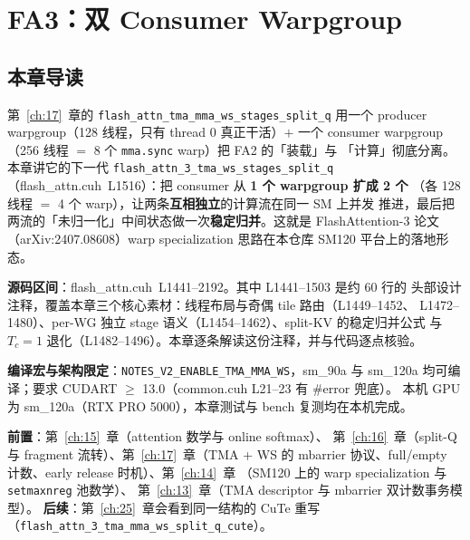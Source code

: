 \chapter{FA3：双 Consumer Warpgroup}\label{ch:18}

\section{本章导读}

第~\ref{ch:17}~章的 \texttt{flash\_\allowbreak{}attn\_\allowbreak{}tma\_\allowbreak{}mma\_\allowbreak{}ws\_\allowbreak{}stages\_\allowbreak{}split\_\allowbreak{}q} 用一个
producer warpgroup（128 线程，只有 thread 0 真正干活）$+$ 一个 consumer
warpgroup（256 线程 $=$ 8 个 \texttt{mma.sync} warp）把 FA2 的「装载」与
「计算」彻底分离。本章讲它的下一代 \texttt{flash\_\allowbreak{}attn\_\allowbreak{}3\_\allowbreak{}tma\_\allowbreak{}ws\_\allowbreak{}stages\_\allowbreak{}split\_\allowbreak{}q}
（flash\_attn.cuh~L1516）：把 consumer 从 \textbf{1 个 warpgroup 扩成 2 个}
（各 128 线程 $=$ 4 个 warp），让两条\textbf{互相独立}的计算流在同一 SM 上并发
推进，最后把两流的「未归一化」中间状态做一次\textbf{稳定归并}。这就是
FlashAttention-3 论文（arXiv:2407.08608）warp specialization 思路在本仓库
SM120 平台上的落地形态。

\textbf{源码区间}：flash\_attn.cuh~L1441--2192。其中 L1441--1503 是约 60 行的
头部设计注释，覆盖本章三个核心素材：线程布局与奇偶 tile 路由（L1449--1452、
L1472--1480）、per-WG 独立 stage 语义（L1454--1462）、split-KV 的稳定归并公式
与 $T_c{=}1$ 退化（L1482--1496）。本章逐条解读这份注释，并与代码逐点核验。

\textbf{编译宏与架构限定}：\texttt{NOTES\_\allowbreak{}V2\_\allowbreak{}ENABLE\_\allowbreak{}TMA\_\allowbreak{}MMA\_\allowbreak{}WS}，sm\_90a 与
sm\_120a 均可编译；要求 CUDART $\ge$ 13.0（common.cuh L21--23 有 \#error 兜底）。
本机 GPU 为 sm\_120a（RTX PRO 5000），本章测试与 bench 复测均在本机完成。

\textbf{前置}：第~\ref{ch:15}~章（attention 数学与 online softmax）、
第~\ref{ch:16}~章（split-Q 与 fragment 流转）、第~\ref{ch:17}~章（TMA + WS 的
mbarrier 协议、full/empty 计数、early release 时机）、第~\ref{ch:14}~章
（SM120 上的 warp specialization 与 \texttt{setmaxnreg} 池数学）、
第~\ref{ch:13}~章（TMA descriptor 与 mbarrier 双计数事务模型）。
\textbf{后续}：第~\ref{ch:25}~章会看到同一结构的 CuTe 重写
（\texttt{flash\_\allowbreak{}attn\_\allowbreak{}3\_\allowbreak{}tma\_\allowbreak{}mma\_\allowbreak{}ws\_\allowbreak{}split\_\allowbreak{}q\_\allowbreak{}cute}）。


